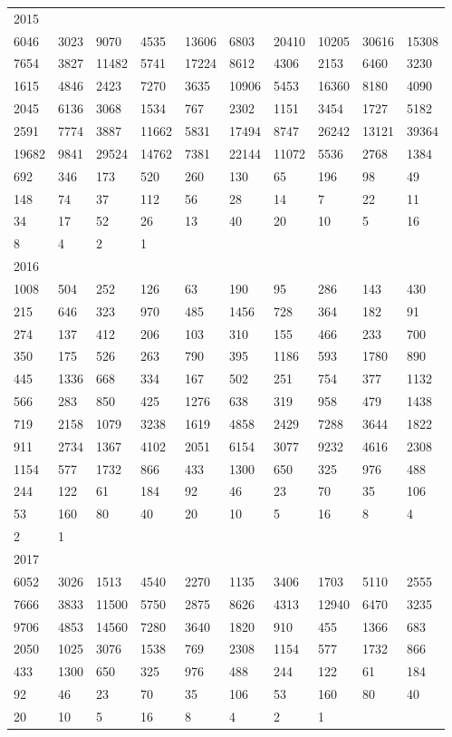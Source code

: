 \begin{longtable}{*{10}{l}}
2015&&&&&&&&&\\
6046& 3023& 9070& 4535& 13606& 6803& 20410& 10205& 30616& 15308\\
7654& 3827& 11482& 5741& 17224& 8612& 4306& 2153& 6460& 3230\\
1615& 4846& 2423& 7270& 3635& 10906& 5453& 16360& 8180& 4090\\
2045& 6136& 3068& 1534& 767& 2302& 1151& 3454& 1727& 5182\\
2591& 7774& 3887& 11662& 5831& 17494& 8747& 26242& 13121& 39364\\
19682& 9841& 29524& 14762& 7381& 22144& 11072& 5536& 2768& 1384\\
692& 346& 173& 520& 260& 130& 65& 196& 98& 49\\
148& 74& 37& 112& 56& 28& 14& 7& 22& 11\\
34& 17& 52& 26& 13& 40& 20& 10& 5& 16\\
8& 4& 2& 1& \\

2016&&&&&&&&&\\
1008& 504& 252& 126& 63& 190& 95& 286& 143& 430\\
215& 646& 323& 970& 485& 1456& 728& 364& 182& 91\\
274& 137& 412& 206& 103& 310& 155& 466& 233& 700\\
350& 175& 526& 263& 790& 395& 1186& 593& 1780& 890\\
445& 1336& 668& 334& 167& 502& 251& 754& 377& 1132\\
566& 283& 850& 425& 1276& 638& 319& 958& 479& 1438\\
719& 2158& 1079& 3238& 1619& 4858& 2429& 7288& 3644& 1822\\
911& 2734& 1367& 4102& 2051& 6154& 3077& 9232& 4616& 2308\\
1154& 577& 1732& 866& 433& 1300& 650& 325& 976& 488\\
244& 122& 61& 184& 92& 46& 23& 70& 35& 106\\
53& 160& 80& 40& 20& 10& 5& 16& 8& 4\\
2& 1& \\

2017&&&&&&&&&\\
6052& 3026& 1513& 4540& 2270& 1135& 3406& 1703& 5110& 2555\\
7666& 3833& 11500& 5750& 2875& 8626& 4313& 12940& 6470& 3235\\
9706& 4853& 14560& 7280& 3640& 1820& 910& 455& 1366& 683\\
2050& 1025& 3076& 1538& 769& 2308& 1154& 577& 1732& 866\\
433& 1300& 650& 325& 976& 488& 244& 122& 61& 184\\
92& 46& 23& 70& 35& 106& 53& 160& 80& 40\\
20& 10& 5& 16& 8& 4& 2& 1& \\


\end{longtable}
